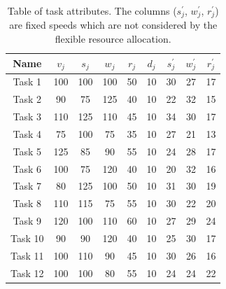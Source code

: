 \begin{table}[h]
    \begin{tabular}{|c|c|c|c|c|c|c|c|c|} \hline
        Name & $v_j$ & $s_j$ & $w_j$ & $r_j$ & $d_j$ & $s^{'}_j$ & $w^{'}_j$ & $r^{'}_j$ \\ [0.5ex] \hline
        Task 1 & 100 & 100 & 100 & 50 & 10 & 30 & 27 & 17 \\ \hline
        Task 2 & 90 & 75 & 125 & 40 & 10 & 22 & 32 & 15 \\ \hline
        Task 3 & 110 & 125 & 110 & 45 & 10 & 34 & 30 & 17 \\ \hline
        Task 4 & 75 & 100 & 75 & 35 & 10 & 27 & 21 & 13 \\ \hline
        Task 5 & 125 & 85 & 90 & 55 & 10 & 24 & 28 & 17 \\ \hline
        Task 6 & 100 & 75 & 120 & 40 & 10 & 20 & 32 & 16 \\ \hline
        Task 7 & 80 & 125 & 100 & 50 & 10 & 31 & 30 & 19 \\ \hline
        Task 8 & 110 & 115 & 75 & 55 & 10 & 30 & 22 & 20 \\ \hline
        Task 9 & 120 & 100 & 110 & 60 & 10 & 27 & 29 & 24 \\ \hline
        Task 10 & 90 & 90 & 120 & 40 & 10 & 25 & 30 & 17 \\ \hline
        Task 11 & 100 & 110 & 90 & 45 & 10 & 30 & 26 & 16 \\ \hline
        Task 12 & 100 & 100 & 80 & 55 & 10 & 24 & 24 & 22 \\ \hline
    \end{tabular}
    \caption{Table of task attributes. The columns ($s^{'}_j$, $w^{'}_j$, $r^{'}_j$) are fixed speeds which are not
    considered by the flexible resource allocation.}
    \label{tab:example-tasks-properties}
\end{table}